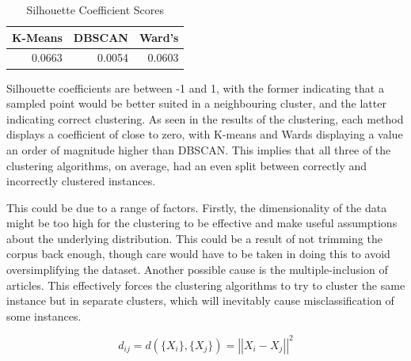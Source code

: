 \documentclass[11pt]{article}
\begin{document}
\begin{table}[htbp]
  \centering
  \caption{Silhouette Coefficient Scores}
    \begin{tabular}{rrr}
    \toprule
    K-Means & DBSCAN & Ward's \\
    \midrule
    0.0663 & 0.0054 & 0.0603 \\
    \bottomrule
    \end{tabular}%
  \label{tab:sil}%
\end{table}%

Silhouette coefficients are between -1 and 1, with the former indicating that a sampled point would be better suited in a neighbouring cluster, and the latter indicating correct clustering. As seen in the results of the clustering, each method displays a coefficient of close to zero, with K-means and Wards displaying a value an order of magnitude higher than DBSCAN. This implies that all three of the clustering algorithms, on average, had an even split between correctly and incorrectly clustered instances. 


This could be due to a range of factors. Firstly, the dimensionality of the data might be too high for the clustering to be effective and make useful assumptions about the underlying distribution. This could be a result of not trimming the corpus back enough, though care would have to be taken in doing this to avoid oversimplifying the dataset. Another possible cause is the multiple-inclusion of articles. This effectively forces the clustering algorithms to try to cluster the same instance but in separate clusters, which will inevitably cause misclassification of some instances. 

\begin{equation}
\label{ward-eq}
d_{ij} = d(\{X_{i}\},\{X_{j}\}) = {\left\vert\left\vert X_{i} - X_{j} \right\vert\right\vert}^{2}
\end{equation}
\end{document}
